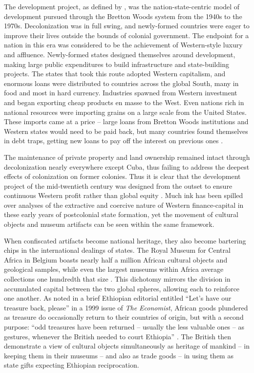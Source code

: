 \documentclass{../../../coursework}
\begin{document}
The development project, as defined by \textcite{McM04}, was the
nation-state-centric model of development pursued through the Bretton Woods
system from the 1940s to the 1970s. Decolonization was in full swing, and
newly-formed countries were eager to improve their lives outside the bounds of
colonial government. The endpoint for a nation in this era was considered to
be the achievement of Western-style luxury and affluence. Newly-formed states
designed themselves around development, making large public expenditures to
build infrastructure and state-building projects. The states that took this
route adopted Western capitalism, and enormous loans were distributed to
countries across the global South, many in food and most in hard currency.
Industries spawned from Western investment and began exporting cheap products
en masse to the West. Even nations rich in national resources were importing
grains on a large scale from the United States. These imports came at a price
-- large loans from Bretton Woods institutions and Western states would need
to be paid back, but many countries found themselves in debt traps, getting
new loans to pay off the interest on previous ones \parencite{McM04}.

The maintenance of private property and land ownership remained intact through
decolonization nearly everywhere except Cuba, thus failing to address the
deepest effects of colonization on former colonies. Thus it is clear that the
development project of the mid-twentieth century was designed from the outset
to ensure continuous Western profit rather than global equity
\parencite{Fra66}. Much ink has been spilled over analyses of the extractive
and coercive nature of Western finance-capital in these early years of
postcolonial state formation, yet the movement of cultural objects and museum
artifacts can be seen within the same framework.

When confiscated artifacts become national heritage, they also become
bartering chips in the international dealings of states. The Royal Museum for
Central Africa in Belgium boasts nearly half a million African cultural
objects and geological samples, while even the largest museums within Africa
average collections one hundredth that size \parencite{Shy09}. This dichotomy
mirrors the division in accumulated capital between the two global spheres,
allowing each to reinforce one another. As noted in a brief Ethiopian
editorial entitled ``Let's have our treasure back, please'' in a 1999 issue of
\textit{The Economist}, African goods plundered as treasure do occasionally
return to their countries of origin, but with a second purpose: ``odd
treasures have been returned -- usually the less valuable ones -- as gestures,
whenever the British needed to court Ethiopia'' \parencite[66]{The99}. The
British then demonstrate a view of cultural objects simultaneously as heritage
of mankind -- in keeping them in their museums -- and also as trade goods --
in using them as state gifts expecting Ethiopian reciprocation.
\end{document}
